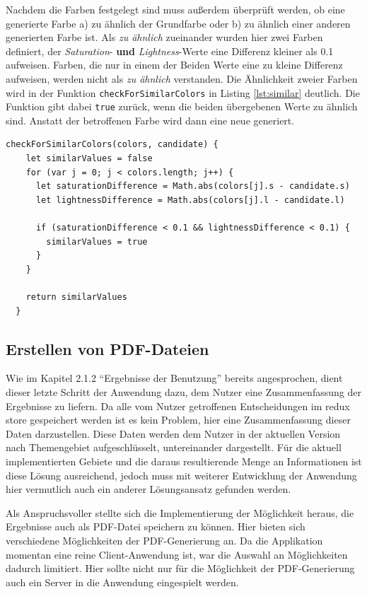 Nachdem die Farben festgelegt sind muss außerdem überprüft werden, ob  eine generierte Farbe a) zu ähnlich der Grundfarbe oder b) zu ähnlich einer anderen generierten Farbe ist.
Als \textit{zu ähnlich} zueinander wurden hier zwei Farben definiert, der \textit{Saturation}- \textbf{und} \textit{Lightness}-Werte eine Differenz kleiner als 0.1 aufweisen. Farben, die nur in einem der Beiden Werte eine zu kleine Differenz aufweisen, werden nicht als \textit{zu ähnlich} verstanden.
Die Ähnlichkeit zweier Farben wird in  der Funktion \verb|checkForSimilarColors| in Listing \ref{lst:similar} deutlich. Die Funktion gibt dabei \verb|true| zurück, wenn die beiden übergebenen Werte zu ähnlich sind. Anstatt der betroffenen Farbe wird dann eine neue generiert.

\begin{lstlisting}[caption=Überprüfen der Ähnlichkeit zweier Farben, label=lst:similar]
  checkForSimilarColors(colors, candidate) {
    let similarValues = false
    for (var j = 0; j < colors.length; j++) {
      let saturationDifference = Math.abs(colors[j].s - candidate.s)
      let lightnessDifference = Math.abs(colors[j].l - candidate.l)

      if (saturationDifference < 0.1 && lightnessDifference < 0.1) {
        similarValues = true
      }
    }

    return similarValues
  }
\end{lstlisting}


\subsection{Erstellen von PDF-Dateien}
Wie im Kapitel 2.1.2 “Ergebnisse der Benutzung”  bereits angesprochen, dient dieser letzte Schritt der Anwendung dazu, dem Nutzer eine Zusammenfassung der Ergebnisse zu liefern.
Da alle vom Nutzer getroffenen Entscheidungen im redux store gespeichert werden ist es kein Problem, hier eine Zusammenfassung dieser Daten darzustellen.
Diese Daten werden dem Nutzer in der aktuellen Version nach Themengebiet aufgeschlüsselt, untereinander dargestellt. Für die aktuell implementierten Gebiete und die daraus resultierende Menge an Informationen ist diese Lösung ausreichend, jedoch muss mit weiterer Entwicklung der Anwendung hier vermutlich auch ein anderer Lösungsansatz gefunden werden.

Als Anspruchsvoller stellte sich die Implementierung der Möglichkeit heraus, die Ergebnisse auch als PDF-Datei speichern zu können. Hier bieten sich verschiedene Möglichkeiten der PDF-Generierung an. Da die Applikation momentan eine reine Client-Anwendung ist, war die Auswahl an Möglichkeiten dadurch limitiert. Hier sollte nicht nur für die Möglichkeit der PDF-Generierung auch ein Server in die Anwendung eingespielt werden.

